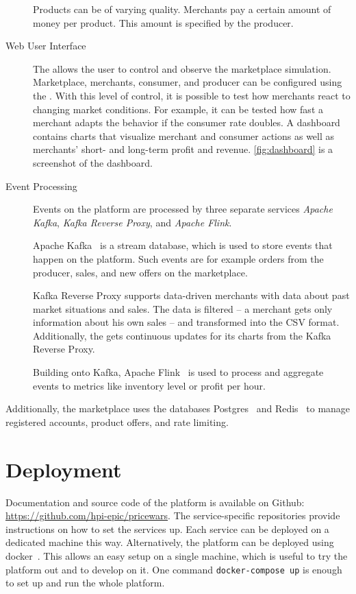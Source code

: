 \begin{description}
		Products can be of varying quality.
		Merchants pay a certain amount of money per product.
		This amount is specified by the producer.
	\item [Web User Interface]
		The \ui allows the user to control and observe the marketplace simulation.
		Marketplace, merchants, consumer, and producer can be configured using the \ui.
		With this level of control, it is possible to test how merchants react to changing market conditions.
		For example, it can be tested how fast a merchant adapts the behavior if the consumer rate doubles.
		A dashboard contains charts that visualize merchant and consumer actions as well as merchants' short- and long-term profit and revenue.
		\cref{fig:dashboard} is a screenshot of the dashboard.
	\item [Event Processing]
	Events on the platform are processed by three separate services \textit{Apache Kafka}, \textit{Kafka Reverse Proxy}, and \textit{Apache Flink}.
	
	Apache Kafka~\cite{garg2013apache} is a stream database, which is used to store events that happen on the platform. Such events are for example orders from the producer, sales, and new offers on the marketplace.
	
	Kafka Reverse Proxy supports data-driven merchants with data about past market situations and sales.
	The data is filtered -- a merchant gets only information about his own sales -- and transformed into the CSV format.
	Additionally, the \ui gets continuous updates for its charts from the Kafka Reverse Proxy.
	
	Building onto Kafka, Apache Flink~\cite{carbone2015apache} is used to process and aggregate events to metrics like inventory level or profit per hour.
\end{description}

Additionally, the marketplace uses the databases Postgres~\cite{postgres} and Redis~\cite{carlson2013redis} to manage registered accounts, product offers, and rate limiting.

\section{Deployment}
Documentation and source code of the \pricewars platform is available on Github: \url{https://github.com/hpi-epic/pricewars}.
The service-specific repositories provide instructions on how to set the services up.
Each service can be deployed on a dedicated machine this way.
Alternatively, the \pricewars platform can be deployed using docker~\cite{Merkel:2014:DLL:2600239.2600241}.
This allows an easy setup on a single machine, which is useful to try the platform out and to develop on it.
One command \texttt{docker-compose up} is enough to set up and run the whole \pricewars platform.
